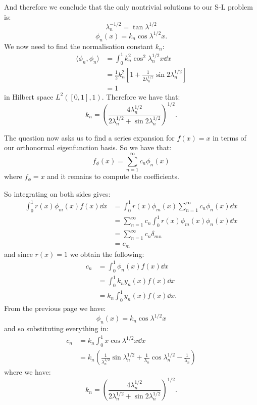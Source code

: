 \begin{enumerate}
    And therefore we conclude that the only nontrivial solutions to our S-L problem is:
    $$\lambda_n^{-1/2}=\tan\lambda^{1/2}$$
    $$\phi_n(x)=k_n\cos\lambda^{1/2}x.$$
    We now need to find the normalisation constant $k_n$:
    \begin{align*}
        \langle\phi_n, \phi_n \rangle
        &=\int_{0}^{1}k_n^2\cos^2\lambda_n^{1/2}x\dd x \\
        &=\frac{1}{2}k_n^2
        \left[1+\frac{1}{2\lambda_n^{1/2}}\sin2\lambda_n^{1/2}\right] \\
        &=1
    \end{align*}
    in Hilbert space $L^2([0,1],1)$. Therefore we have that:
    $$k_n=\left(\frac{4\lambda_n^{1/2}}{2\lambda_n^{1/2}+\sin2\lambda_n^{1/2}}\right)^{1/2}.$$

    \newpage

    The question now asks us to find a series expansion for $f(x)=x$ in terms
    of our orthonormal eigenfunction basis. So we have that:
    $$f_\phi(x)=\sum_{n=1}^{\infty}c_n\phi_n(x)$$
    where $f_\phi=x$ and it remains to compute the coefficients.

    So integrating on both sides gives:
    \begin{align*}
        \int_{0}^{1}r(x)\phi_m(x)f(x)\dd x
        &=\int_{0}^{1}r(x)\phi_m(x)
        \sum_{n=1}^{\infty} c_n\phi_n(x)\dd x \\
        &=\sum_{n=1}^{\infty} c_n
        \int_{0}^{1}r(x)\phi_m(x)\phi_n(x)\dd x \\
        &=\sum_{n=1}^{\infty} c_n\delta_{mn} \\
        &=c_m
    \end{align*}
    and since $r(x)=1$ we obtain the following:
    \begin{align*}
        c_n
        &=\int_{0}^{1}\phi_n(x)f(x)\dd x \\
        &=\int_{0}^{1}k_n y_n(x)f(x)\dd x \\
        &=k_n\int_{0}^{1}y_n(x)f(x)\dd x.
    \end{align*}
    From the previous page we have:
    $$\phi_n(x)=k_n\cos\lambda^{1/2}x$$
    and so substituting everything in:
    \begin{align*}
        c_n
        &=k_n\int_{0}^{1}x\cos\lambda^{1/2}x\dd x \\
        &=k_n\left(\frac{1}{\lambda_n^{1/2}}\sin\lambda_n^{1/2}
        +\frac{1}{\lambda_n}\cos\lambda_n^{1/2}-\frac{1}{\lambda_n}\right)
    \end{align*}
    where we have:
    $$k_n=\left(\frac{4\lambda_n^{1/2}}{2\lambda_n^{1/2}+\sin2\lambda_n^{1/2}}\right)^{1/2}.$$


\end{enumerate}
